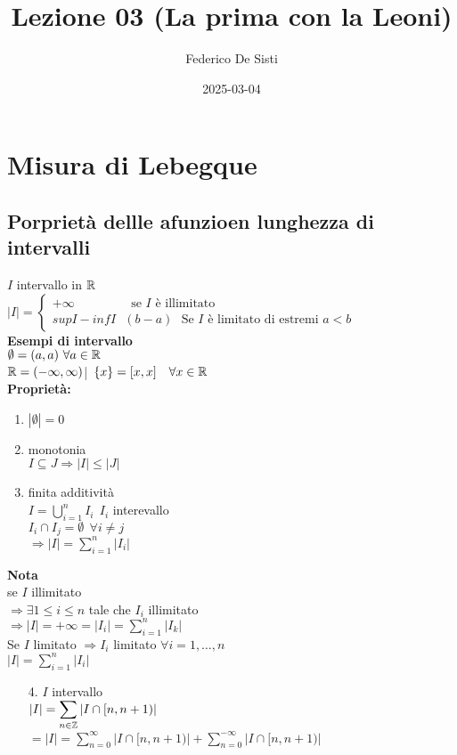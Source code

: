 \documentclass[12px]{article}
\title{Lezione 03 (La prima con la Leoni)}
\date{2025-03-04}
\author{Federico De Sisti}
\begin{document}
	\maketitle
	\newpage
	\section{Misura di Lebegque}
	\subsection{Porprietà dellle afunzioen lunghezza di intervalli}
	$I$ intervallo in $\mathbb{R}$ \\
	$|I| = \begin{cases}
		+\infty \ \ \ \ \ \ \ \ \ \ \ \ \ \ \ \ \ \ \ \text { se } I \text { è illimitato}\\
		sup I - inf I  \ \ \ (b - a)  \ \ \ \text{Se } I \text{ è limitato di estremi } a < b
	\end{cases}$\\
\textbf{Esempi di intervallo}\\
$\emptyset = (a,a) \ \forall a \in \mathbb{R}$\\
 $\mathbb{R} = (-\infty, \infty)$|\
 $\{x\} = [x,x] \ \ \ \forall x\in \mathbb{R}$ \\
 \textbf{Proprietà:}
 \begin{enumerate}
	 \item $|\emptyset  | = 0$
	 \item monotonia\\
		 $I\subseteq J \Rightarrow  |I| \leq |J|$
	 \item finita additività\\
		  $\displaystyle I = \bigcup^n_{i = 1} I_i \ \ I_i$ interevallo\\
		  $I_i\cap I_j = \emptyset \ \ \forall i\neq j$\\
		  $  \displaystyle \Rightarrow |I| = \sum^n_{i=1} |I_i|$
  \end{enumerate}
  \textbf{Nota}\\
se $I$ illimitato\\
$ \Rightarrow  \exists 1\leq i\leq n $ tale che $I_i$ illimitato\\
 $ \Rightarrow |I| = +\infty = |I_i| = \sum^n_{i=1}|I_k|$ \\
 Se $I$ limitato $ \Rightarrow  I_i$ limitato $\forall i = 1,\ldots, n$\\
$|I| = \sum^n_{i=1}|I_i|$
\begin{enumerate}
	\item[4.] $I$ intervallo\\
		$\displaystyle |I| = \sum_{n\in\mathbb{Z}}|I\cap [n,n+1)|$\\
		$\displaystyle = |I| = \sum^\infty_{n=0}|I\cap [n, n + 1)| + \sum^{-\infty}_{n=0}|I\cap [n, n + 1)|$
\end{enumerate}
\end{document}
